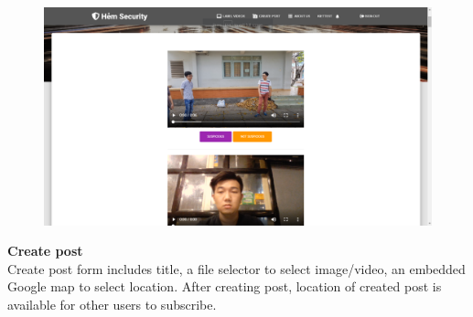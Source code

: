 \begin{figure}[!htb]
\endminipage\hfill
{}
  \includegraphics[width=\linewidth]{images/chap4/label_video.png}
\endminipage
\end{figure}
\cleardoublepage
\textbf{Create post}
\\
Create post form includes title, a file selector to select image/video, an embedded Google map to select location. After creating post, location of created post is available for other users to subscribe.

